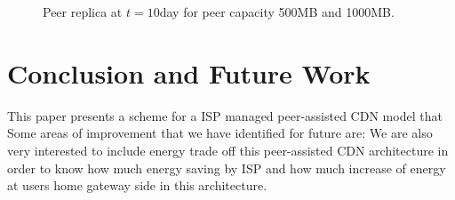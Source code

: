 \documentclass[conference]{IEEEtran}
\begin{document}
\begin{figure}[!th]
\centering
{}
\hfill
{}
\caption{Peer replica at $t=10$day for peer capacity 500MB and 1000MB.}
\label{fig:replicaat10daybypopularity}
\vspace{-2mm}
\end{figure}





\section{Conclusion and Future Work}\label{conclusion}
This paper presents a scheme for a ISP managed peer-assisted CDN model that 
Some areas of improvement that we have identified for future are:
We are also very interested to include energy trade off this peer-assisted CDN architecture in order to know how much energy saving by ISP and how much increase of energy at users home gateway side in this architecture.
\end{document}
